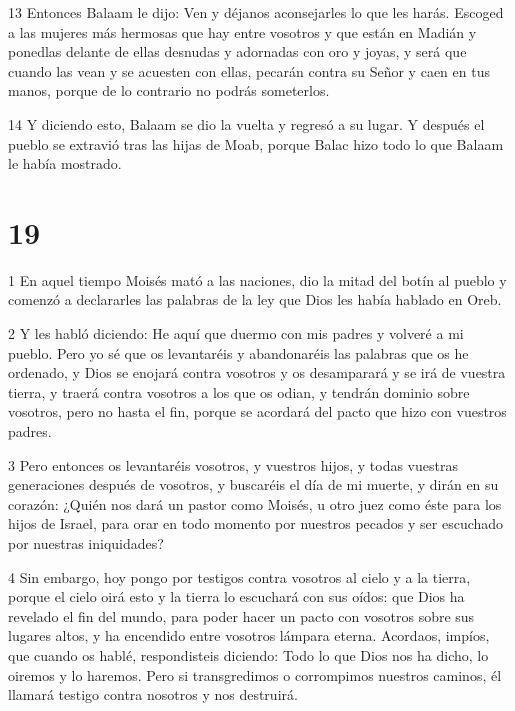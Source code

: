 \par 13 Entonces Balaam le dijo: Ven y déjanos aconsejarles lo que les harás. Escoged a las mujeres más hermosas que hay entre vosotros y que están en Madián y ponedlas delante de ellas desnudas y adornadas con oro y joyas, y será que cuando las vean y se acuesten con ellas, pecarán contra su Señor y caen en tus manos, porque de lo contrario no podrás someterlos.

\par 14 Y diciendo esto, Balaam se dio la vuelta y regresó a su lugar. Y después el pueblo se extravió tras las hijas de Moab, porque Balac hizo todo lo que Balaam le había mostrado.

\chapter{19}

\par 1 En aquel tiempo Moisés mató a las naciones, dio la mitad del botín al pueblo y comenzó a declararles las palabras de la ley que Dios les había hablado en Oreb.

\par 2 Y les habló diciendo: He aquí que duermo con mis padres y volveré a mi pueblo. Pero yo sé que os levantaréis y abandonaréis las palabras que os he ordenado, y Dios se enojará contra vosotros y os desamparará y se irá de vuestra tierra, y traerá contra vosotros a los que os odian, y tendrán dominio sobre vosotros, pero no hasta el fin, porque se acordará del pacto que hizo con vuestros padres.

\par 3 Pero entonces os levantaréis vosotros, y vuestros hijos, y todas vuestras generaciones después de vosotros, y buscaréis el día de mi muerte, y dirán en su corazón: ¿Quién nos dará un pastor como Moisés, u otro juez como éste para los hijos de Israel, para orar en todo momento por nuestros pecados y ser escuchado por nuestras iniquidades?

\par 4 Sin embargo, hoy pongo por testigos contra vosotros al cielo y a la tierra, porque el cielo oirá esto y la tierra lo escuchará con sus oídos: que Dios ha revelado el fin del mundo, para poder hacer un pacto con vosotros sobre sus lugares altos, y ha encendido entre vosotros lámpara eterna. Acordaos, impíos, que cuando os hablé, respondisteis diciendo: Todo lo que Dios nos ha dicho, lo oiremos y lo haremos. Pero si transgredimos o corrompimos nuestros caminos, él llamará testigo contra nosotros y nos destruirá.

